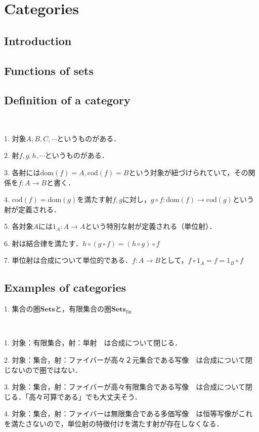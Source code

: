 \documentclass[uplatex, 12pt, dvipdfmx]{jsarticle}
\title{}
\author{司馬博文 J4-190549\\hirofumi-shiba48@g.ecc.u-tokyo.ac.jp}
\date{\today}
\begin{document}
\section{Categories}

\subsection{Introduction}
\subsection{Functions of sets}
\subsection{Definition of a category}
\begin{definition}[Category]　

    1. 対象$A,B,C,\cdots$というものがある．

    2. 射$f,g,h,\cdots$というものがある．

    3. 各射には$\mathrm{dom}(f)=A, \mathrm{cod}(f)=B$という対象が紐づけられていて，その関係を$f:A\to B$と書く．

    4. $\mathrm{cod}(f)=\mathrm{dom}(g)$を満たす射$f,g$に対し，$g\circ f:\mathrm{dom}(f)\to \mathrm{cod}(g)$という射が定義される．

    5. 各対象$A$には$1_A:A\to A$という特別な射が定義される（単位射）．

    6. 射は結合律を満たす．$h\circ (g\circ f)=(h\circ g)\circ f$

    7. 単位射は合成について単位的である．$f:A\to B$として，$f\circ 1_A=f=1_B\circ f$
\end{definition}

\subsection{Examples of categories}

1. 集合の圏$\mathbf{Sets}$と，有限集合の圏$\mathbf{Sets}_\mathrm{fin}$
\begin{example*}　

    1. 対象：有限集合，射：単射　は合成について閉じる．

    2. 対象：集合，射：ファイバーが高々２元集合である写像　は合成について閉じないので圏ではない．

    3. 対象：集合，射：ファイバーが高々有限集合である写像　は合成について閉じる．「高々可算である」でも大丈夫そう．

    4. 対象：集合，射：ファイバーは無限集合である多価写像　は恒等写像がこれを満たさないので，単位射の特徴付けを満たす射が存在しなくなる．
\end{example*}
\end{document}
